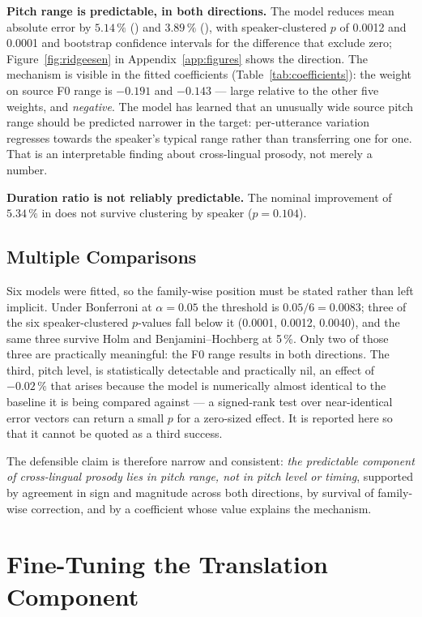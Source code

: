 \textbf{Pitch range is predictable, in both directions.} The model reduces mean absolute error by
$5.14\,\%$ (\ento{}) and $3.89\,\%$ (\esto{}), with speaker-clustered $p$ of 0.0012 and 0.0001 and
bootstrap confidence intervals for the difference that exclude zero; Figure~\ref{fig:ridgeesen} in
Appendix~\ref{app:figures} shows the \esto{} direction. The mechanism is visible in the fitted
coefficients (Table~\ref{tab:coefficients}): the weight on source F0 range is $-0.191$ and
$-0.143$ --- large relative
to the other five weights, and \emph{negative}. The model has learned that an unusually wide
source pitch range should be predicted narrower in the target: per-utterance variation regresses
towards the speaker's typical range rather than transferring one for one. That is an interpretable
finding about cross-lingual prosody, not merely a number.

\textbf{Duration ratio is not reliably predictable.} The nominal improvement of $5.34\,\%$ in
\esto{} does not survive clustering by speaker ($p=0.104$).

\subsection{Multiple Comparisons}
\label{sec:multiplicity}

Six models were fitted, so the family-wise position must be stated rather than left implicit.
Under Bonferroni at $\alpha=0.05$ the threshold is $0.05/6=0.0083$; three of the six
speaker-clustered $p$-values fall below it (0.0001, 0.0012, 0.0040), and the same three survive
Holm and Benjamini--Hochberg at 5\,\%. Only two of those three are practically meaningful: the F0
range results in both directions. The third, \ento{} pitch level, is statistically detectable and
practically nil, an effect of $-0.02\,\%$ that arises because the model is numerically almost
identical to the baseline it is being compared against --- a signed-rank test over near-identical
error vectors can return a small $p$ for a zero-sized effect. It is reported here so that it cannot
be quoted as a third success.

The defensible claim is therefore narrow and consistent: \emph{the predictable component of
cross-lingual prosody lies in pitch range, not in pitch level or timing}, supported by agreement in
sign and magnitude across both directions, by survival of family-wise correction, and by a
coefficient whose value explains the mechanism.

\section{Fine-Tuning the Translation Component}
\label{sec:finetune_result}

